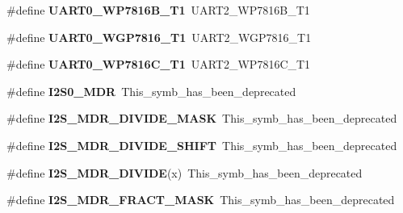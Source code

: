 \begin{DoxyCompactItemize}
\item 
\mbox{\label{group___s_d_k___compatibility___symbols_gaba0e3465f8f88322375e0288c390c877}} 
\#define {\bfseries U\+A\+R\+T0\+\_\+\+W\+P7816\+B\+\_\+\+T1}~U\+A\+R\+T2\+\_\+\+W\+P7816\+B\+\_\+\+T1
\item 
\mbox{\label{group___s_d_k___compatibility___symbols_ga4351aea2ef4fe4a597fec7cf383c6c87}} 
\#define {\bfseries U\+A\+R\+T0\+\_\+\+W\+G\+P7816\+\_\+\+T1}~U\+A\+R\+T2\+\_\+\+W\+G\+P7816\+\_\+\+T1
\item 
\mbox{\label{group___s_d_k___compatibility___symbols_ga25fa897330b3da692e76b1eae4a3d3a8}} 
\#define {\bfseries U\+A\+R\+T0\+\_\+\+W\+P7816\+C\+\_\+\+T1}~U\+A\+R\+T2\+\_\+\+W\+P7816\+C\+\_\+\+T1
\item 
\mbox{\label{group___s_d_k___compatibility___symbols_ga8d4df147e022a1cd6e739291b0f21438}} 
\#define {\bfseries I2\+S0\+\_\+\+M\+DR}~This\+\_\+symb\+\_\+has\+\_\+been\+\_\+deprecated
\item 
\mbox{\label{group___s_d_k___compatibility___symbols_ga3b44d8acfaecde14d97877635d471e13}} 
\#define {\bfseries I2\+S\+\_\+\+M\+D\+R\+\_\+\+D\+I\+V\+I\+D\+E\+\_\+\+M\+A\+SK}~This\+\_\+symb\+\_\+has\+\_\+been\+\_\+deprecated
\item 
\mbox{\label{group___s_d_k___compatibility___symbols_ga96fc58c33527f6dba2be28151ecdb6b2}} 
\#define {\bfseries I2\+S\+\_\+\+M\+D\+R\+\_\+\+D\+I\+V\+I\+D\+E\+\_\+\+S\+H\+I\+FT}~This\+\_\+symb\+\_\+has\+\_\+been\+\_\+deprecated
\item 
\mbox{\label{group___s_d_k___compatibility___symbols_ga12b79478094d1367a54d08fd0372546d}} 
\#define {\bfseries I2\+S\+\_\+\+M\+D\+R\+\_\+\+D\+I\+V\+I\+DE}(x)~This\+\_\+symb\+\_\+has\+\_\+been\+\_\+deprecated
\item 
\mbox{\label{group___s_d_k___compatibility___symbols_ga0686acbd342566fcf227b91122b901cc}} 
\#define {\bfseries I2\+S\+\_\+\+M\+D\+R\+\_\+\+F\+R\+A\+C\+T\+\_\+\+M\+A\+SK}~This\+\_\+symb\+\_\+has\+\_\+been\+\_\+deprecated

\end{DoxyCompactItemize}

